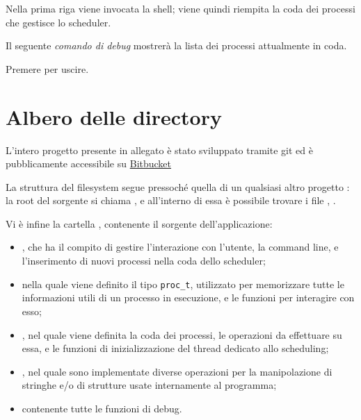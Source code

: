 \documentclass[11pt]{article}
\begin{document}
\noindent Nella prima riga viene invocata la shell; viene quindi riempita la
coda dei processi che gestisce lo scheduler.
\\ 

\noindent Il seguente \emph{comando di debug} mostrer\`a la lista dei processi
attualmente in coda.
\\ 

\noindent Premere  per uscire.

\section{Albero delle directory}

L'intero progetto presente in allegato \`e stato sviluppato tramite git ed
\`e pubblicamente accessibile su
\href{https://bitbucket.org/maker/shellder/}{Bitbucket}

La struttura del filesystem segue pressoch\'e quella di un qualsiasi altro progetto :
la root del sorgente si chiama , e all'interno di essa \`e possibile trovare i
file , .

Vi \`e infine la cartella , contenente il sorgente dell'applicazione:
\begin{itemize}
\item {}, che ha il compito di gestire l'interazione con l'utente, la command line,
       e l'inserimento di nuovi processi nella coda dello scheduler;

\item {} nella quale viene definito il tipo \texttt{proc\_t}, utilizzato per memorizzare
	   tutte le informazioni utili di un processo in esecuzione, e le funzioni per interagire con esso;

\item {}, nel quale viene definita la coda dei processi, le operazioni da
       effettuare su essa, e le funzioni di inizializzazione del thread dedicato allo scheduling;

\item {}, nel quale sono implementate diverse operazioni per la manipolazione di
       stringhe e/o di strutture usate internamente al programma;

\item {} contenente tutte le funzioni di debug.
\end{itemize}
\end{document}
